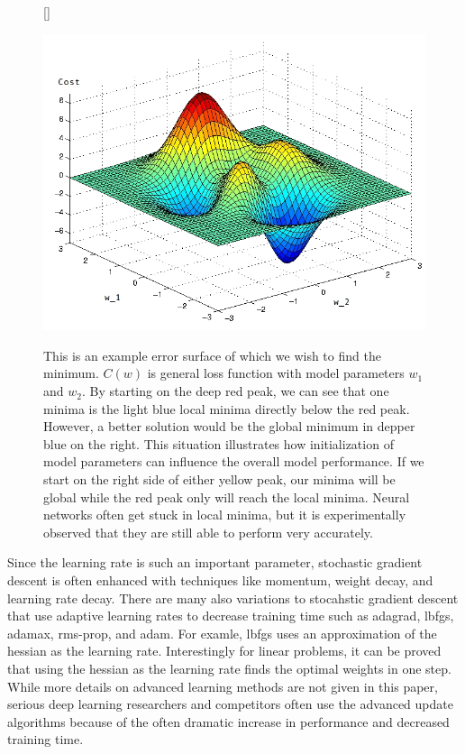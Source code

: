 \documentclass[11pt]{article}
\begin{document}
\begin{figure}[H]
  [\FBwidth]
  {\caption{This is an example error surface of which we wish to find the minimum. $C(w)$ is general loss function with model parameters $w_{1}$ and $w_{2}$. By starting on the deep red peak, we can see that one minima is the light blue local minima directly below the red peak. However, a better solution would be the global minimum in depper blue on the right. This situation illustrates how initialization of model parameters can influence the overall model performance. If we start on the right side of either yellow peak, our minima will be global while the red peak only will reach the local minima. Neural networks often get stuck in local minima, but it is experimentally observed that they are still able to perform very accurately.
}\label{fig:error_plot}}{\includegraphics[width=0.9\linewidth]{error_plot}}
\end{figure}

Since the learning rate is such an important parameter, stochastic gradient descent is often enhanced with techniques like momentum, weight decay, and learning rate decay. There are many also variations to stocahstic gradient descent that use adaptive learning rates to decrease training time such as adagrad, lbfgs, adamax, rms-prop, and adam. For examle, lbfgs uses an approximation of the hessian as the learning rate. Interestingly for linear problems, it can be proved that using the hessian as the learning rate finds the optimal weights in one step. While more details on advanced learning methods are not given in this paper, serious deep learning researchers and competitors often use the advanced update algorithms because of the often dramatic increase in performance and decreased training time.
\end{document}
